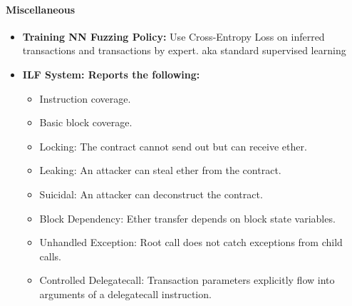 \paragraph{Miscellaneous}
\begin{itemize}
    \item \textbf{Training NN Fuzzing Policy: } Use Cross-Entropy Loss on inferred transactions and transactions by expert. aka standard supervised learning
    \item \textbf{ILF System: Reports the following:}
    \begin{itemize}
        \item Instruction coverage.
        \item Basic block coverage.
        \item Locking: The contract cannot send out but can receive ether.
        \item Leaking: An attacker can steal ether from the contract.
        \item Suicidal: An attacker can deconstruct the contract.
        \item Block Dependency: Ether transfer depends on block state variables.
        \item Unhandled Exception: Root call does not catch exceptions from child calls.
        \item Controlled Delegatecall: Transaction parameters explicitly flow into arguments of a delegatecall instruction.
    \end{itemize}{}
\end{itemize}{}